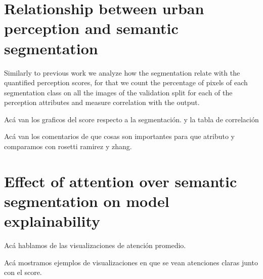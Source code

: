 \section{Relationship between urban perception and semantic segmentation}

Similarly to previous work \cite{rossetti, zhang_measuring} we analyze how the segmentation relate with the quantified
perception scores, for that we count the percentage of pixels of each segmentation class
on all the images of the validation split for each of the perception attributes and measure
correlation with the output.

Acá van los graficos del score respecto a la segmentación. y la tabla de correlación

Acá van los comentarios de que cosas son importantes para que atributo y comparamos con rosetti ramirez y zhang.

\section{Effect of attention over semantic segmentation on model explainability}
Acá hablamos de las visualizaciones de atención promedio.

Acá mostramos ejemplos de visualizaciones en que se vean atenciones claras junto con el score.